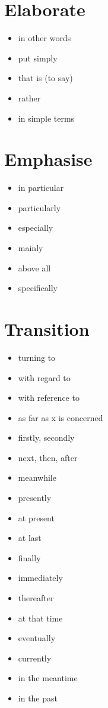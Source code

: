 \documentclass[twocolumn, a4paper]{article}
\begin{document}
\section{Elaborate}
{\color{ForestGreen}
	\begin{itemize}[leftmargin=*, noitemsep]
		\item in other words
		\item put simply
		\item that is (to say)
		\item rather
		\item in simple terms
	\end{itemize}
}

\section{Emphasise}
{\color{myBlue}
	\begin{itemize}[leftmargin=*, noitemsep]
		\item in particular
		\item particularly
		\item especially
		\item mainly
		\item above all
		\item specifically
	\end{itemize}
}

\section{Transition}
{\color{NavyBlue}
	\begin{itemize}[leftmargin=*, noitemsep]
		\item turning to
		\item with regard to
		\item with reference to
		\item as far as x is concerned
		\item firstly, secondly
		\item next, then, after
		\item meanwhile
		\item presently
		\item at present
		\item at last
		\item finally
		\item immediately
		\item thereafter
		\item at that time
		\item eventually
		\item currently
		\item in the meantime
		\item in the past
	\end{itemize}
}
\end{document}
